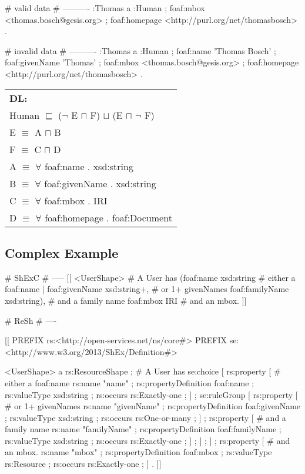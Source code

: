 \documentclass{llncs}
\newenvironment{DL}{
  \scriptsize
  \sffamily
  \vspace{0.3cm}
  \begin{tabular}{l}
	\textbf{DL:} \\

}{
  \end{tabular}
  \linebreak
}
\begin{document}
\begin{ex}
# valid data
# ----------
:Thomas
    a :Human ;
    foaf:mbox <thomas.bosch@gesis.org> ;
    foaf:homepage <http://purl.org/net/thomasbosch> .
\end{ex}

\begin{ex}
# invalid data
# ----------
:Thomas
    a :Human ;
    foaf:name 'Thomas Bosch' ;
    foaf:givenName 'Thomas' ;
    foaf:mbox <thomas.bosch@gesis.org> ;
    foaf:homepage <http://purl.org/net/thomasbosch> .
\end{ex}

\begin{DL}
Human $\sqsubseteq$ ($\neg$ E $\sqcap$ F) $\sqcup$ (E $\sqcap$ $\neg$ F) \\ 
E $\equiv$ A $\sqcap$ B \\
F $\equiv$ C $\sqcap$ D \\
A $\equiv$ $\forall$ foaf:name . xsd:string \\
B $\equiv$ $\forall$ foaf:givenName . xsd:string \\ 
C $\equiv$ $\forall$ foaf:mbox . IRI \\
D $\equiv$ $\forall$ foaf:homepage . foaf:Document \\
\end{DL}

\subsection{Complex Example}

\begin{ex}
# ShExC
# -----
[[
  <UserShape> {                          # A User has
    (foaf:name xsd:string                #  either a foaf:name
     | foaf:givenName xsd:string+,       #   or 1+ givenNames
       foaf:familyName xsd:string),      #   and a family name
    foaf:mbox IRI                        # and an mbox.
  }
]]
\end{ex}

\begin{ex}
# ReSh
# ----

[[
  PREFIX rs:<http://open-services.net/ns/core#>
  PREFIX se:<http://www.w3.org/2013/ShEx/Definition#>

  <UserShape> a rs:ResourceShape ;       # A User has
    se:choice [
      rs:property [                      #  either a foaf:name
        rs:name "name" ;
        rs:propertyDefinition foaf:name ;
        rs:valueType xsd:string ;
        rs:occurs rs:Exactly-one ;
      ] ;
      se:ruleGroup [
        rs:property [                    #   or 1+ givenNames
          rs:name "givenName" ;
          rs:propertyDefinition foaf:givenName ;
          rs:valueType xsd:string ;
          rs:occurs rs:One-or-many ;
        ] ;
        rs:property [                    #   and a family name
          rs:name "familyName" ;
          rs:propertyDefinition foaf:familyName ;
          rs:valueType xsd:string ;
          rs:occurs rs:Exactly-one ;
        ] ;
      ] ;
    ] ;
    rs:property [                        # and an mbox.
      rs:name "mbox" ;
      rs:propertyDefinition foaf:mbox ;
      rs:valueType rs:Resource ;
      rs:occurs rs:Exactly-one ;
    ] .
]]
\end{ex}
\end{document}
